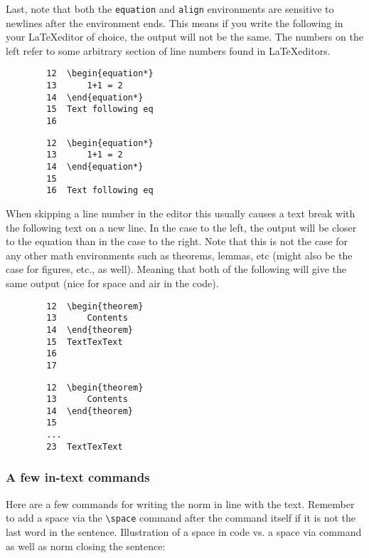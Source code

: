 \documentclass[../thesis.tex]{subfiles}
\begin{document}
Last, note that both the \verb|equation| and \verb|align| environments are sensitive to newlines after the environment ends. This means if you write the following in your \LaTeX editor of choice, the output will not be the same. The numbers on the left refer to some arbitrary section of line numbers found in \LaTeX editors. 
\begin{multicols}{2}
    \begin{verbatim}
        12  \begin{equation*}
        13      1+1 = 2 
        14  \end{equation*}
        15  Text following eq
        16   
    \end{verbatim}
    \columnbreak
    \begin{verbatim}
        12  \begin{equation*}
        13      1+1 = 2 
        14  \end{equation*}
        15   
        16  Text following eq
    \end{verbatim}
\end{multicols}
When skipping a line number in the editor this usually causes a text break with the following text on a new line. In the case to the left, the output will be closer to the equation than in the case to the right. Note that this is not the case for any other math environments such as theorems, lemmas, etc (might also be the case for figures, etc., as well). Meaning that both of the following will give the same output (nice for space and air in the code). 
\begin{multicols}{2}
    \begin{verbatim}
        12  \begin{theorem}
        13      Contents
        14  \end{theorem}
        15  TextTexText
        16
        17
    \end{verbatim}
    \columnbreak
    \begin{verbatim}
        12  \begin{theorem}
        13      Contents
        14  \end{theorem}
        15  
        ...  
        23  TextTexText
    \end{verbatim}
\end{multicols}


\subsubsection{A few in-text commands}
Here are a few commands for writing the norm in line with the text. Remember to add a space via the \verb|\space| command after the command itself if it is not the last word in the sentence. Illustration of a space in code vs. a space via \space command as well as norm closing the sentence: 
\end{document}
